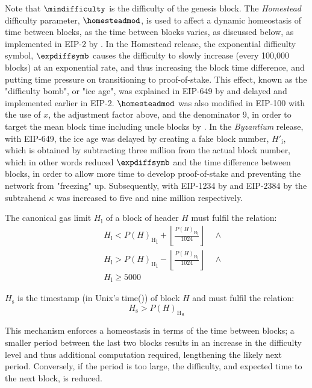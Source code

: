 \documentclass[9pt,oneside]{amsart}
\begin{document}
\begin{multicols}{2}
Note that $\mindifficulty$ is the difficulty of the genesis block. The \textit{Homestead} difficulty parameter, $\homesteadmod$, is used to affect a dynamic homeostasis of time between blocks, as the time between blocks varies, as discussed below, as implemented in EIP-2 by \cite{EIP-2}.
In the Homestead release, the exponential difficulty symbol, $\expdiffsymb$ causes the difficulty to slowly increase (every 100,000 blocks) at an exponential rate, and thus increasing the block time difference, and putting time pressure on transitioning to proof-of-stake.
This effect, known as the "difficulty bomb", or "ice age", was explained in EIP-649 by \cite{EIP-649} and delayed and implemented earlier in EIP-2.
$\homesteadmod$ was also modified in EIP-100 with the use of $x$, the adjustment factor above, and the denominator 9, in order to target the mean block time including uncle blocks by \cite{EIP-100}.
In the \textit{Byzantium} release, with EIP-649, the ice age was delayed by creating a fake block number, $H'_{\mathrm{i}}$, which is obtained by subtracting three million from the actual block number,
which in other words reduced $\expdiffsymb$ and the time difference between blocks, in order to allow more time to develop proof-of-stake and preventing the network from "freezing" up.
Subsequently, with EIP-1234 by \cite{EIP-1234} and EIP-2384 by \cite{EIP-2384} the subtrahend $\kappa$ was increased to five and nine million respectively.

\hypertarget{block_gas_limit_H__l}{}The canonical gas limit $H_{\mathrm{l}}$ of a block of header $H$ must fulfil the relation:
\begin{eqnarray}
& & H_{\mathrm{l}} < {P(H)_{\mathrm{H}}}_{\mathrm{l}} + \left\lfloor\frac{{P(H)_{\mathrm{H}}}_{\mathrm{l}}}{1024}\right\rfloor \quad \wedge \\
\nonumber& & H_{\mathrm{l}} > {P(H)_{\mathrm{H}}}_{\mathrm{l}} - \left\lfloor\frac{{P(H)_{\mathrm{H}}}_{\mathrm{l}}}{1024}\right\rfloor \quad \wedge \\
\nonumber& & H_{\mathrm{l}} \geqslant 5000
\end{eqnarray}

\hypertarget{block_timestamp_H__s}{}$H_{\mathrm{s}}$ is the timestamp (in Unix's time()) of block $H$ and must fulfil the relation:
\begin{equation}
H_{\mathrm{s}} > {P(H)_{\mathrm{H}}}_{\mathrm{s}}
\end{equation}

This mechanism enforces a homeostasis in terms of the time between blocks; a smaller period between the last two blocks results in an increase in the difficulty level and thus additional computation required, lengthening the likely next period. Conversely, if the period is too large, the difficulty, and expected time to the next block, is reduced.


\end{multicols}
\end{document}
